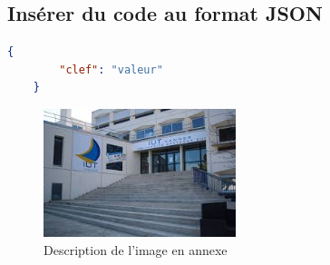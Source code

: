 \documentclass[french]{report}
\begin{document}
    
    
    \subsection{Insérer du code au format JSON}
    \begin{lstlisting}[language=json,firstnumber=1,caption={Description du document},captionpos=b]
    {
        "clef": "valeur"
    }
    \end{lstlisting}
    
    

\clearpage
\printglossaries



\clearpage
{}\vspace*{25px} %
   \begin{figure}
            \center
            \includegraphics[width=0.5\textwidth]{Images/AccueilIut.jpg}
            \caption{Description de l'image en annexe}
            \label{fig:accueilIUTAnnexe}
    \end{figure}




\clearpage


\end{document}
